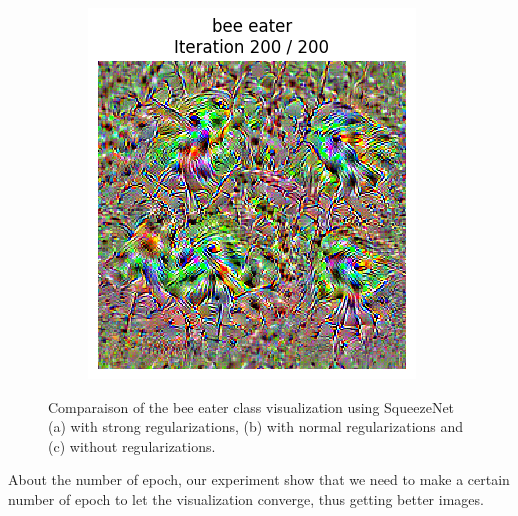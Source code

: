 \begin{figure}[H]
\begin{subfigure}[t]{.33\textwidth}
        \caption{}
        \label{fig:class_viz_reg:sub2}
    \end{subfigure}%
    \begin{subfigure}[t]{.33\textwidth}
        \centering
        \includegraphics[width=\linewidth]{SqueezeNet/bird_animated_no_reg_last_frame.png}
        \caption{}
        \label{fig:class_viz_reg:sub3}
    \end{subfigure}
    \caption{Comparaison of the bee eater class visualization using SqueezeNet (a) with strong regularizations, (b) with normal regularizations and (c) without regularizations.} %
    \label{fig:class_viz_reg}
\end{figure}


About the number of epoch, our experiment show that we need to make a certain number of epoch to let the visualization converge, thus getting better images.

